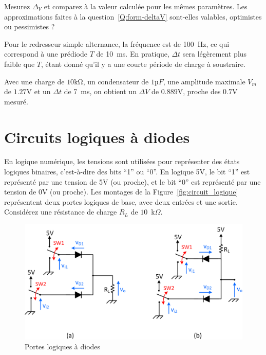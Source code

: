 \documentclass{../template/labo}
\begin{document}
\begin{manip}
\Question
{
	Mesurez $\Delta_V$ et comparez à la valeur calculée pour les mêmes paramètres. Les approximations faites à la question~\ref{Q:form-deltaV} sont-elles valables, optimistes ou pessimistes ?
}
{
Pour le redresseur simple alternance, la fréquence est de 100~Hz, ce qui correspond à une prédiode $T$ de 10~ms.
En pratique, $\Delta t$ sera légèrement plus faible que $T$, étant donné qu'il y a une courte période de charge à soustraire.

Avec une charge de $10 \si{\kohm}$, un condensateur de $1 µF$, une amplitude maximale $V_m$ de $1.27 \si{\volt}$ et un $\Delta t$ de 7~ms, on obtient un $\Delta V$ de $0.889 \si{\volt}$, proche des $0.7 \si{\volt}$ mesuré.


}%
	\label{Q:15}
\end{manip}




\clearpage
\section{Circuits logiques à diodes}

En logique numérique, les tensions sont utilisées pour représenter des états logiques binaires, c'est-à-dire des bits ``1'' ou ``0''. En logique 5V, le bit ``1'' est représenté par une tension de 5V (ou proche), et le bit ``0'' est représenté par une tension de 0V (ou proche). Les montages de la Figure~\vref{fig:circuit_logique} représentent deux portes logiques de base, avec deux entrées et une sortie. Considérez une résistance de charge $R_L$ de $10$~k$\Omega$. 
\begin{figure}[h!]
	\begin{center}
		\includegraphics[scale=0.85]{figures/Circuits_logiques_diodes.png}
	\end{center}
\caption{Portes logiques à diodes}
\label{fig:circuit_logique}
\end{figure}
\end{document}
